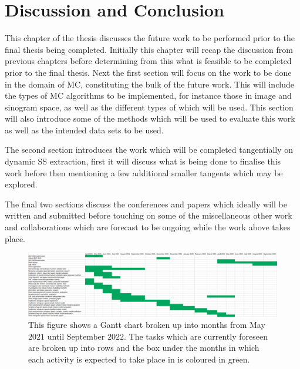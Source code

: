 \chapter{Discussion and Conclusion} \label{sec:discussion_and_conclusion}
    \newpage
    
        This chapter of the thesis discusses the future work to be performed prior to the final thesis being completed. Initially this chapter will recap the discussion from previous chapters before determining from this what is feasible to be completed prior to the final thesis. Next the first section will focus on the work to be done in the domain of \gls{MC}, constituting the bulk of the future work. This will include the types of \gls{MC} algorithms to be implemented, for instance those in image and sinogram space, as well as the different types of  which will be used. This section will also introduce some of the methods which will be used to evaluate this work as well as the intended data sets to be used.
        
        The second section introduces the work which will be completed tangentially on dynamic \gls{SS} extraction, first it will discuss what is being done to finalise this work before then mentioning a few additional smaller tangents which may be explored.
        
        The final two sections discuss the conferences and papers which ideally will be written and submitted before touching on some of the miscellaneous other work and collaborations which are forecast to be ongoing while the work above takes place.
    
        \begin{landscape}
            \begin{figure}
                \centering
                    
                \includegraphics[width=1.0\linewidth]{figures/future_work_gantt_chart.png}
                    
                \captionsetup{singlelinecheck=false, justification=centering}
                \caption{This figure shows a Gantt chart broken up into months from May $2021$ until September $2022$. The tasks which are currently foreseen are broken up into rows and the box under the months in which each activity is expected to take place in is coloured in green.}
                \label{fig:future_work_gantt_chart}
            \end{figure}
        \end{landscape}
        
